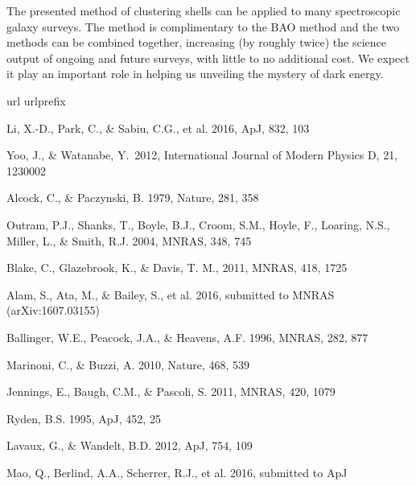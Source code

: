 \documentclass{natureprintstyle}
\begin{document}
The presented method of clustering shells can be applied to many spectroscopic galaxy surveys. 
The method is complimentary to the BAO method and the two methods can be combined together, 
increasing (by roughly twice) the science output of ongoing and future surveys, with little to no additional cost.
We expect it play an important role in helping us unveiling the mystery of dark energy.


\begin{thebibliography}{10}
\expandafter\ifx\csname url\endcsname\relax
  \def\url#1{\texttt{#1}}\fi
\expandafter\ifx\csname urlprefix\endcsname\relax\def\urlprefix{URL }\fi
\providecommand{\bibinfo}[2]{#2}
\providecommand{\eprint}[2][]{\url{#2}}

Li, X.-D., Park, C., \& Sabiu, C.G., et al. 2016, ApJ, 832, 103

Yoo, J., \& Watanabe, Y.\ 2012, International Journal of Modern Physics D, 21, 1230002 

Alcock, C., \& Paczynski, B. 1979, Nature, 281, 358  

Outram, P.J., Shanks, T., Boyle, B.J., Croom, S.M., Hoyle, F., Loaring, N.S., 
Miller, L., \& Smith, R.J. 2004, MNRAS, 348, 745  

Blake, C., Glazebrook, K., \& Davis, T. M., 2011, MNRAS, 418, 1725  

Alam, S., Ata, M., \& Bailey, S., et al. 2016,
submitted to MNRAS (arXiv:1607.03155)

Ballinger, W.E., Peacock, J.A., \& Heavens, A.F. 1996, MNRAS, 282, 877  

Marinoni, C., \& Buzzi, A. 2010, Nature, 468, 539  

Jennings, E., Baugh, C.M., \& Pascoli, S. 2011, MNRAS, 420, 1079  

Ryden, B.S. 1995, ApJ, 452, 25  

Lavaux, G., \& Wandelt, B.D. 2012, ApJ, 754, 109  

Mao, Q., Berlind, A.A., Scherrer, R.J., et al. 2016, submitted to ApJ



\end{thebibliography}
\end{document}
